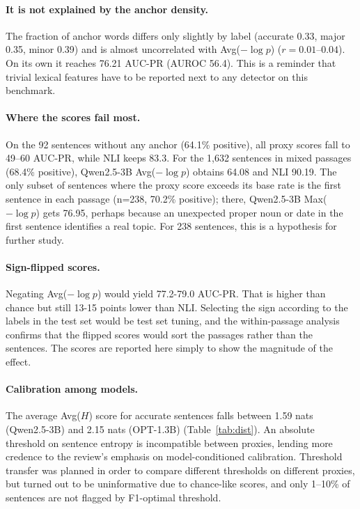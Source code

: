 \documentclass[acmsmall,screen,review,nonacm]{acmart}
\begin{document}
\paragraph{It is not explained by the anchor density.} The fraction of anchor words differs only slightly by label (accurate 0.33, major 0.35, minor 0.39) and is almost uncorrelated with Avg($-\log p$) ($r=0.01$--$0.04$). On its own it reaches 76.21 AUC-PR (AUROC 56.4). This is a reminder that trivial lexical features have to be reported next to any detector on this benchmark.

\paragraph{Where the scores fail most.} On the 92 sentences without any anchor (64.1\% positive), all proxy scores fall to 49--60 AUC-PR, while NLI keeps 83.3. For the 1{,}632 sentences in mixed passages (68.4\% positive), Qwen2.5-3B Avg($-\log p$) obtains 64.08 and NLI 90.19. The only subset of sentences where the proxy score exceeds its base rate is the first sentence in each passage (n=238, 70.2\% positive); there, Qwen2.5-3B Max($-\log p$) gets 76.95, perhaps because an unexpected proper noun or date in the first sentence identifies a real topic. For 238 sentences, this is a hypothesis for further study.

\paragraph{Sign-flipped scores.} Negating Avg($-\log p$) would yield 77.2-79.0 AUC-PR. That is higher than chance but still 13-15 points lower than NLI. Selecting the sign according to the labels in the test set would be test set tuning, and the within-passage analysis confirms that the flipped scores would sort the passages rather than the sentences. The scores are reported here simply to show the magnitude of the effect.

\paragraph{Calibration among models.} The average Avg($H$) score for accurate sentences falls between 1.59 nats (Qwen2.5-3B) and 2.15 nats (OPT-1.3B) (Table~\ref{tab:dist}). An absolute threshold on sentence entropy is incompatible between proxies, lending more credence to the review's emphasis on model-conditioned calibration. Threshold transfer was planned in order to compare different thresholds on different proxies, but turned out to be uninformative due to chance-like scores, and only 1--10\% of sentences are not flagged by F1-optimal threshold.
\end{document}
